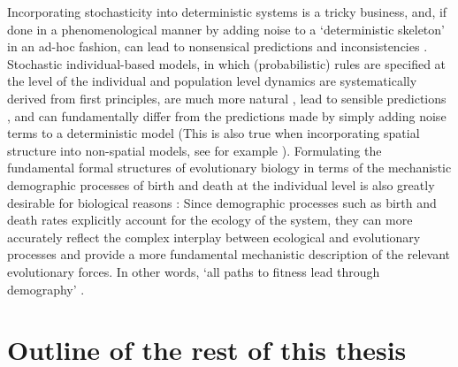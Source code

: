 Incorporating stochasticity into deterministic systems is a tricky business, and, if done in a phenomenological manner by adding noise to a `deterministic skeleton' \citep{coulson_skeletons_2004} in an ad-hoc fashion, can lead to nonsensical predictions and inconsistencies \citep{strang_how_2019}. Stochastic individual-based models, in which (probabilistic) rules are specified at the level of the individual and population level dynamics are systematically derived from first principles, are much more natural \citep{black_stochastic_2012}, lead to sensible predictions \citep{strang_how_2019}, and can fundamentally differ from the predictions made by simply adding noise terms to a deterministic model \citep{strang_how_2019} (This is also true when incorporating spatial structure into non-spatial models, see for example \cite{durrett_importance_1994}). Formulating the fundamental formal structures of evolutionary biology in terms of the mechanistic demographic processes of birth and death at the individual level is also greatly desirable for biological reasons \citep{metcalf_why_2007,geritz_mathematical_2012}: Since demographic processes such as birth and death rates explicitly account for the ecology of the system, they can more accurately reflect the complex interplay between ecological and evolutionary processes \citep{doebeli_towards_2017} and provide a more fundamental mechanistic description of the relevant evolutionary forces. In other words, `all paths to fitness lead through demography' \citep{metcalf_all_2007}.

\section{Outline of the rest of this thesis}


